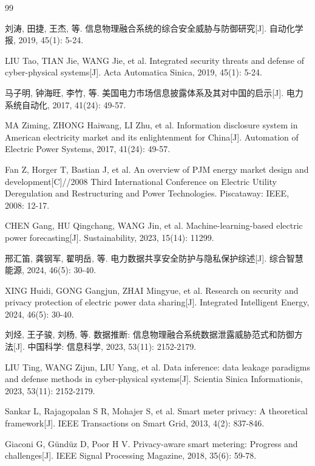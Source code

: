 \documentclass[UTF8,zihao=5,twoside]{ctexart}
\numberwithin{equation}{section}
\begin{document}
\balance
\begin{thebibliography}{99}
\small
\setlength{\itemsep}{0pt}
\setlength{\parsep}{0pt}
\setlength{\parskip}{0pt}

刘涛, 田捷, 王杰, 等. 信息物理融合系统的综合安全威胁与防御研究[J]. 自动化学报, 2019, 45(1): 5-24.

LIU Tao, TIAN Jie, WANG Jie, et al. Integrated security threats and defense of cyber-physical systems[J]. Acta Automatica Sinica, 2019, 45(1): 5-24.

马子明, 钟海旺, 李竹, 等. 美国电力市场信息披露体系及其对中国的启示[J]. 电力系统自动化, 2017, 41(24): 49-57.

MA Ziming, ZHONG Haiwang, LI Zhu, et al. Information disclosure system in American electricity market and its enlightenment for China[J]. Automation of Electric Power Systems, 2017, 41(24): 49-57.

Fan Z, Horger T, Bastian J, et al. An overview of PJM energy market design and development[C]//2008 Third International Conference on Electric Utility Deregulation and Restructuring and Power Technologies. Piscataway: IEEE, 2008: 12-17.

CHEN Gang, HU Qingchang, WANG Jin, et al. Machine-learning-based electric power forecasting[J]. Sustainability, 2023, 15(14): 11299.

邢汇笛, 龚钢军, 翟明岳, 等. 电力数据共享安全防护与隐私保护综述[J]. 综合智慧能源, 2024, 46(5): 30-40.

XING Huidi, GONG Gangjun, ZHAI Mingyue, et al. Research on security and privacy protection of electric power data sharing[J]. Integrated Intelligent Energy, 2024, 46(5): 30-40.

刘烃, 王子骏, 刘杨, 等. 数据推断: 信息物理融合系统数据泄露威胁范式和防御方法[J]. 中国科学: 信息科学, 2023, 53(11): 2152-2179.

LIU Ting, WANG Zijun, LIU Yang, et al. Data inference: data leakage paradigms and defense methods in cyber-physical systems[J]. Scientia Sinica Informationis, 2023, 53(11): 2152-2179.

Sankar L, Rajagopalan S R, Mohajer S, et al. Smart meter privacy: A theoretical framework[J]. IEEE Transactions on Smart Grid, 2013, 4(2): 837-846.

Giaconi G, Gündüz D, Poor H V. Privacy-aware smart metering: Progress and challenges[J]. IEEE Signal Processing Magazine, 2018, 35(6): 59-78.


\end{thebibliography}
\end{document}
